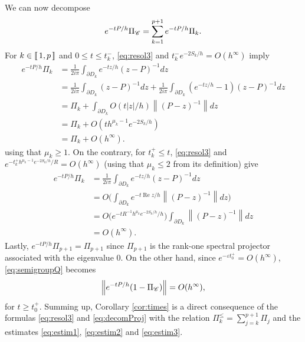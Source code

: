 \documentclass[12pt]{amsart}
\renewcommand{\Re}{\operatorname{Re}}
\numberwithin{equation}{section}
\numberwithin{figure}{section}
\newcommand{\vvert}[1]{\left\lVert#1\right\rVert}
\newcommand{\lb}{\operatorname{[\negthinspace [}}
\newcommand{\rb}{\operatorname{]\negthinspace ]}}
\begin{document}
We can now decompose
\begin{equation}\label{eq:decomProj}
e^{-tP/h}\Pi_{\mathscr C} = \sum_{k=1}^{p+1}e^{-tP/h}\Pi_k.
\end{equation}
For $k\in\lb1,p\rb$ and $0\leq t\leq t_k^-$, \eqref{eq:resol3} and $t_k^-e^{-2S_k/h} = O(h^\infty)$ imply
\begin{equation}\label{eq:estim1}
\begin{split}
    e^{-tP/h}\Pi_k &= \frac{1}{2i\pi}\int_{\partial D_k}e^{-tz/h}(z-P)^{-1}dz\\
    &= \frac{1}{2i\pi}\int_{\partial D_k}(z-P)^{-1}dz + \frac{1}{2i\pi}\int_{\partial D_k}(e^{-tz/h} - 1)(z-P)^{-1}dz\\
    &= \Pi_k + \int_{\partial D_k}O(t|z|/h)\vvert{(P-z)^{-1}}dz\\
    &= \Pi_k + O(th^{\mu_k-1}e^{-2S_k/h})\\
    &= \Pi_k + O(h^\infty).
\end{split}
\end{equation}
using that $\mu_k\geq1$. On the contrary, for $t_k^+\leq t$, \eqref{eq:resol3} and $e^{-t_k^+h^{\mu_k-1}e^{-2S_k/h}/R} = O(h^\infty)$ (using that $\mu_k\leq2$ from its definition) give
\begin{equation}\label{eq:estim2}
\begin{split}
    e^{-tP/h}\Pi_k &= \frac{1}{2i\pi}\int_{\partial D_k}e^{-tz/h}(z-P)^{-1}dz\\
    &= O\Big(\int_{\partial D_k}e^{-t\Re z/h}\vvert{(P-z)^{-1}}dz\Big)\\
    &= O\big(e^{-tR^{-1}h^{\mu_k}e^{-2S_k/h}/h}\big)\int_{\partial D_k}\vvert{(P-z)^{-1}}dz\\
    &= O(h^\infty).
\end{split}
\end{equation}
Lastly, $e^{-tP/h}\Pi_{p+1} = \Pi_{p+1}$ since $\Pi_{p+1}$ is the rank-one spectral projector associated with the eigenvalue $0$. On the other hand, since $e^{-\varepsilon t_0^+} = O(h^\infty)$, \eqref{eq:semigroupQ} becomes
\begin{equation}\label{eq:estim3}
\vvert{e^{-tP/h}(1-\Pi_\Cr)} = O(h^\infty),
\end{equation}
for $t\geq t_0^+$. Summing up, Corollary \ref{cor:times} is a direct consequence of the formulas \eqref{eq:resol3} and \eqref{eq:decomProj} with the relation $\Pi_k^\leq = \sum_{j=k}^{p+1}\Pi_j$ and the estimates \eqref{eq:estim1}, \eqref{eq:estim2} and \eqref{eq:estim3}.
\end{document}
